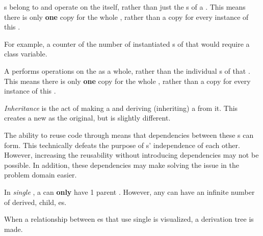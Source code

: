 \begin{definition}\label{def:OOP_Class_Variable}
  \emph{ }s belong to and operate on the  itself, rather than just the s of a .
  This means there is only \textbf{one} copy for the whole , rather than a copy for every instance of this .

  For example, a counter of the number of instantiated s of that  would require a class variable.
\end{definition}

\begin{definition}\label{def:OOP_Class_Method}
  A \emph{ } performs operations on the  as a whole, rather than the individual s of that .
  This means there is only \textbf{one} copy for the whole , rather than a copy for every instance of this .
\end{definition}

\begin{definition}[Inheritance]\label{def:OOP_Inheritance}
  \emph{Inheritance} is the act of making a  and deriving (inheriting) a  from it.
  This creates a new  as the original, but is slightly different.

  \begin{remark}
    The ability to reuse code through  means that dependencies between these s can form.
    This technically defeats the purpose of s' independence of each other.
    However, increasing the reusability without introducing dependencies may not be possible.
    In addition, these dependencies may make solving the issue in the problem domain easier.
  \end{remark}
\end{definition}

\begin{definition}\label{def:OOP_Single_Inheritance}
  In \emph{single }, a  can \textbf{only} have 1 parent .
  However, any  can have an infinite number of derived, child, es.

  When a relationship between es that use single  is visualized, a derivation tree is made.
\end{definition}

